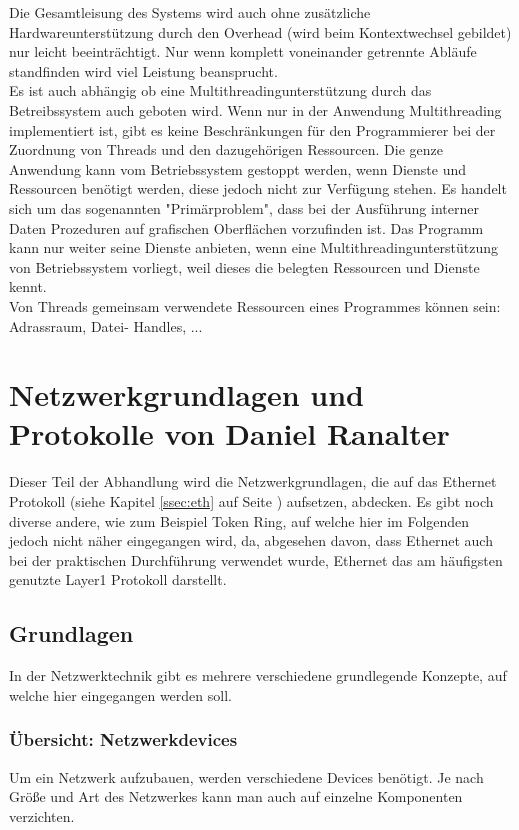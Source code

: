 \documentclass[12pt,a4paper]{report}
\begin{document}
Die Gesamtleisung des Systems wird auch ohne zusätzliche Hardwareunterstützung durch den Overhead (wird beim Kontextwechsel gebildet) nur leicht beeinträchtigt. Nur wenn komplett voneinander getrennte Abläufe standfinden wird viel Leistung beansprucht.\\

Es ist auch abhängig ob eine Multithreadingunterstützung durch das Betreibssystem auch geboten wird. Wenn nur in der Anwendung Multithreading implementiert ist, gibt es keine Beschränkungen für den Programmierer bei der Zuordnung von Threads und den dazugehörigen Ressourcen. Die genze Anwendung kann vom Betriebssystem gestoppt werden, wenn Dienste und Ressourcen benötigt werden, diese jedoch nicht zur Verfügung stehen. Es handelt sich um das sogenannten "{}Primärproblem"{}, dass bei der Ausführung interner Daten Prozeduren auf grafischen Oberflächen vorzufinden ist. Das Programm kann nur weiter seine Dienste anbieten, wenn eine Multithreadingunterstützung von Betriebssystem vorliegt, weil dieses die belegten Ressourcen und Dienste kennt.\\

Von Threads gemeinsam verwendete Ressourcen eines Programmes können sein: Adrassraum, Datei- Handles, 
...\\

\newpage
{}
\chapter{Netzwerkgrundlagen und Protokolle von Daniel Ranalter}
Dieser Teil der Abhandlung wird die Netzwerkgrundlagen, die auf das Ethernet Protokoll (siehe Kapitel \ref{ssec:eth} auf Seite \pageref{ssec:eth}) aufsetzen, abdecken. Es gibt noch diverse andere, wie zum Beispiel Token Ring, auf welche hier im Folgenden jedoch nicht näher eingegangen wird, da, abgesehen davon, dass Ethernet auch bei der praktischen Durchführung verwendet wurde, Ethernet das am häufigsten genutzte Layer1 Protokoll darstellt. 

\section{Grundlagen}
In der Netzwerktechnik gibt es mehrere verschiedene grundlegende Konzepte, auf welche hier eingegangen werden soll.

\subsection{Übersicht: Netzwerkdevices}
Um ein Netzwerk aufzubauen, werden verschiedene Devices benötigt. Je nach Größe und Art des Netzwerkes kann man auch auf einzelne Komponenten verzichten. 
\end{document}
